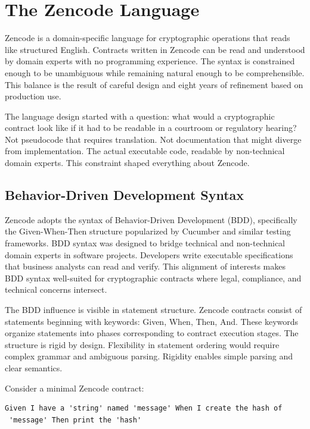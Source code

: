 \section{The Zencode Language}

Zencode is a domain-specific language for cryptographic operations
that reads like structured English. Contracts written in Zencode can
be read and understood by domain experts with no programming
experience. The syntax is constrained enough to be unambiguous while
remaining natural enough to be comprehensible. This balance is the
result of careful design and eight years of refinement based on
production use.

The language design started with a question: what would a
cryptographic contract look like if it had to be readable in a
courtroom or regulatory hearing? Not pseudocode that requires
translation. Not documentation that might diverge from
implementation. The actual executable code, readable by non-technical
domain experts. This constraint shaped everything about Zencode.

\subsection{Behavior-Driven Development Syntax}

Zencode adopts the syntax of Behavior-Driven Development (BDD),
specifically the Given-When-Then structure popularized by Cucumber and
similar testing frameworks. BDD syntax was designed to bridge
technical and non-technical domain experts in software
projects. Developers write executable specifications that business
analysts can read and verify. This alignment of interests makes BDD
syntax well-suited for cryptographic contracts where legal,
compliance, and technical concerns intersect.

The BDD influence is visible in statement structure. Zencode contracts
consist of statements beginning with keywords: Given, When, Then,
And. These keywords organize statements into phases corresponding to
contract execution stages. The structure is rigid by
design. Flexibility in statement ordering would require complex
grammar and ambiguous parsing. Rigidity enables simple parsing and
clear semantics.

Consider a minimal Zencode contract:

\begin{verbatim}
Given I have a 'string' named 'message' When I create the hash of
 'message' Then print the 'hash'
\end{verbatim}

